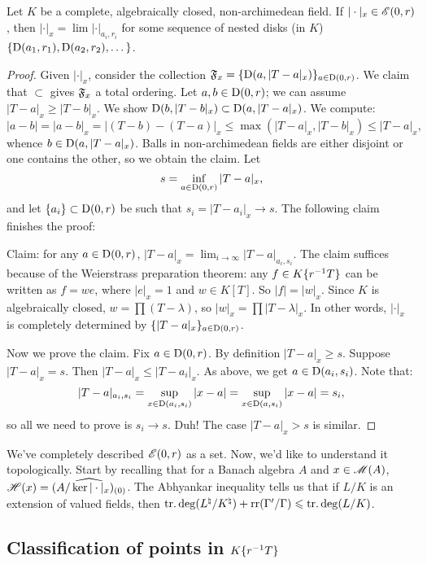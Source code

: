 \begin{theorem}
Let $K$ be a complete, algebraically closed, non-archimedean field. If 
$|\cdot|_x\in \mathscr{E}(0,r)$, then $|\cdot|_x=\lim |\cdot|_{a_i,r_i}$ for some 
sequence of nested disks (in $K$) $\{\operatorname{D}(a_1,r_1),\operatorname{D}(a_2,r_2),\dots\}$. 
\end{theorem}
\begin{proof}
Given $|\cdot|_x$, consider the collection 
$\mathfrak{F}_x=\{\operatorname{D}(a,|T-a|_x)\}_{a\in \operatorname{D}(0,r)}$. We claim that $\subset$ gives 
$\mathfrak{F}_x$ a total ordering. Let $a,b\in \operatorname{D}(0,r)$; we can assume 
$|T-a|_x\geqslant |T-b|_x$. We show $\operatorname{D}(b,|T-b|_x)\subset \operatorname{D}(a,|T-a|_x)$. 
We compute:
\[
	|a-b| = |a-b|_x = |(T-b)-(T-a)|_x \leqslant \max(|T-a|_x,|T-b|_x) \leqslant |T-a|_x ,
\]
whence $b\in \operatorname{D}(a,|T-a|_x)$. Balls in non-archimedean fields are either 
disjoint or one contains the other, so we obtain the claim. Let 
\[
	s = \inf_{a\in \operatorname{D}(0,r)} |T-a|_x ,
\]
and let $\{a_i\}\subset \operatorname{D}(0,r)$ be such that $s_i=|T-a_i|_x\to s$. The 
following claim finishes the proof: 

Claim: for any $a\in \operatorname{D}(0,r)$, 
$|T-a|_x = \lim_{i\to \infty} |T-a|_{a_i,s_i}$. The claim suffices because of 
the Weierstrass preparation theorem: any $f\in K\{ r^{-1} T \}$ can be 
written as $f=w e$, where $|e|_x=1$ and $w\in K[T]$. So $|f|=|w|_x$. Since $K$ 
is algebraically closed, $w=\prod (T-\lambda)$, so 
$|w|_x = \prod |T-\lambda|_x$. In other words, $|\cdot|_x$ is completely 
determined by $\{|T-a|_x\}_{a\in \operatorname{D}(0,r)}$. 

Now we prove the claim. Fix $a\in \operatorname{D}(0,r)$. By definition 
$|T-a|_x\geqslant s$. Suppose $|T-a|_x=s$. Then $|T-a|_x\leqslant |T-a_i|_x$. 
As above, we get $a\in \operatorname{D}(a_i,s_i)$. Note that:
\[
	|T-a|_{a_i,s_i} = \sup_{x\in \operatorname{D}(a_i,s_i)} |x-a| = \sup_{x\in \operatorname{D}(a,s_i)} |x-a| = s_i ,
\]
so all we need to prove is $s_i\to s$. Duh! The case $|T-a|_x>s$ is similar. 
\end{proof}

We've completely described $\mathscr{E}(0,r)$ as a set. Now, we'd like to understand 
it topologically. Start by recalling that for a Banach algebra $A$ and 
$x\in \operatorname{\mathscr{M}}(A)$, $\mathscr{H}(x)=\widehat{(A/\ker |\cdot|_x)_{(0)}}$. The Abhyankar 
inequality tells us that if $L/K$ is an extension of valued fields, then 
$\operatorname{tr.deg}(L^\natural/K^\natural)+\operatorname{rr}(\Gamma'/\Gamma)\leqslant \operatorname{tr.deg}(L/K)$. 





\subsection{Classification of points in \texorpdfstring{$K\{ r^{-1} T \}$}{K(rT)}}

